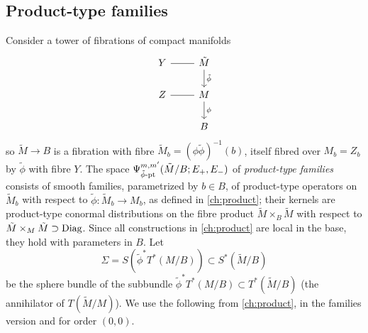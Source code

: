 \subsection{Product-type families}
Consider a tower of fibrations of compact manifolds
\begin{equation}\label{families:eq:tower}
  \begin{tikzcd}
    Y\arrow[r,dash]&\tilde M\arrow[d,"\tilde\phi"]\\
    Z\arrow[r,dash]&M\arrow[d,"\phi"]\\
    &B
  \end{tikzcd}
\end{equation}
so $\tilde M\to B$ is a fibration with fibre $\tilde M_b=(\phi\tilde\phi)^{-1}(b)$,
itself fibred over $M_b=Z_b$ by $\tilde\phi$ with fibre $Y$. The space
$\Psi^{m,m'}_{\tilde\phi\text{-}\mathrm{pt}}(\tilde M/B;E_+,E_-)$ of \emph{product-type families} consists of
smooth families, parametrized by $b\in B$, of product-type operators on
$\tilde M_b$ with respect to $\tilde\phi:\tilde M_b\to M_b$, as defined in
\cref{ch:product}; their kernels are product-type conormal distributions on the
fibre product $\tilde M\times_B\tilde M$ with respect to
$\tilde M\times_M\tilde M\supset\operatorname{Diag}$. Since all constructions in
\cref{ch:product} are local in the base, they hold with parameters in $B$. Let
\begin{equation*}
  \Sigma=S(\tilde\phi^*T^*(M/B))\subset S^*(\tilde M/B)
\end{equation*}
be the sphere bundle of the subbundle $\tilde\phi^*T^*(M/B)\subset
T^*(\tilde M/B)$ (the annihilator of $T(\tilde M/M)$). We use the following
from \cref{ch:product}, in the families version and for order $(0,0)$.

